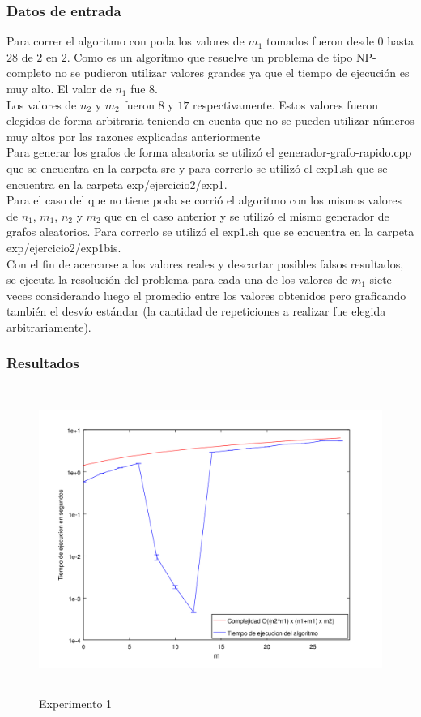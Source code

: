 \subsubsection*{Datos de entrada}\;
   		\noindent Para correr el algoritmo con poda los valores de $m_1$ tomados fueron desde $0$ hasta $28$ de $2$ en $2$. Como es un algoritmo que resuelve un problema de tipo NP-completo no se pudieron utilizar valores grandes ya que el tiempo de ejecución es muy alto. El valor de $n_1$ fue $8$.\\
       Los valores de $n_2$ y $m_2$ fueron $8$ y $17$ respectivamente. Estos valores fueron elegidos de forma arbitraria teniendo en cuenta que no se pueden utilizar números muy altos por las razones explicadas anteriormente\\
        Para generar los grafos de forma aleatoria se utilizó el generador-grafo-rapido.cpp que se encuentra en la carpeta src y para correrlo se utilizó el exp1.sh que se encuentra en la carpeta exp/ejercicio2/exp1. \\
        Para el caso del que no tiene poda se corrió el algoritmo con los mismos valores de $n_1$, $m_1$, $n_2$ y $m_2$ que en el caso anterior y se utilizó el mismo generador de grafos aleatorios. Para correrlo se utilizó el exp1.sh que se encuentra en la carpeta exp/ejercicio2/exp1bis.\\
        Con el fin de acercarse a los valores reales y descartar posibles falsos resultados, se ejecuta la resolución del problema para cada una de los valores de $m_1$ siete veces considerando luego el promedio entre los valores obtenidos pero graficando también el desvío estándar (la cantidad de repeticiones a realizar fue elegida arbitrariamente).\; 

\subsubsection*{Resultados}\;

    \begin{figure}[H]
      \includegraphics[height=10cm]{graficos/ejercicio2-exp1.png}
       \caption{Experimento 1}
	\end{figure}
    

